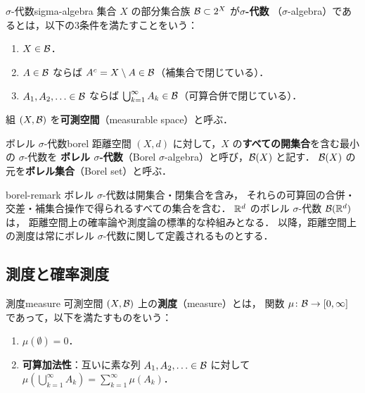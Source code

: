 \begin{definition}{$\sigma$-代数}{sigma-algebra}
  集合 $X$ の部分集合族 $\mathcal{B} \subset 2^X$ が\textbf{$\sigma$-代数}
  （$\sigma$-algebra）であるとは，以下の3条件を満たすことをいう：
  \begin{enumerate}
    \item $X \in \mathcal{B}$．
    \item $A \in \mathcal{B}$ ならば $A^c = X \setminus A \in \mathcal{B}$（補集合で閉じている）．
    \item $A_1, A_2, \ldots \in \mathcal{B}$ ならば
      $\bigcup_{k=1}^{\infty} A_k \in \mathcal{B}$（可算合併で閉じている）．
  \end{enumerate}
  組 $(X, \mathcal{B})$ を\textbf{可測空間}（measurable space）と呼ぶ．
\end{definition}

\begin{definition}{ボレル $\sigma$-代数}{borel}
  距離空間 $(X, d)$ に対して，$X$ の\textbf{すべての開集合}を含む最小の $\sigma$-代数を
  \textbf{ボレル $\sigma$-代数}（Borel $\sigma$-algebra）と呼び，$\mathcal{B}(X)$ と記す．
  $\mathcal{B}(X)$ の元を\textbf{ボレル集合}（Borel set）と呼ぶ．
\end{definition}

\begin{remark}{}{borel-remark}
  ボレル $\sigma$-代数は開集合・閉集合を含み，
  それらの可算回の合併・交差・補集合操作で得られるすべての集合を含む．
  $\mathbb{R}^d$ のボレル $\sigma$-代数 $\mathcal{B}(\mathbb{R}^d)$ は，
  距離空間上の確率論や測度論の標準的な枠組みとなる．
  以降，距離空間上の測度は常にボレル $\sigma$-代数に関して定義されるものとする．
\end{remark}

\subsection{測度と確率測度}
\label{subsec:measures}

\begin{definition}{測度}{measure}
  可測空間 $(X, \mathcal{B})$ 上の\textbf{測度}（measure）とは，
  関数 $\mu \colon \mathcal{B} \to [0, \infty]$ であって，以下を満たすものをいう：
  \begin{enumerate}
    \item $\mu(\emptyset) = 0$．
    \item \textbf{可算加法性}：互いに素な列 $A_1, A_2, \ldots \in \mathcal{B}$
      に対して $\mu\!\left(\bigcup_{k=1}^{\infty} A_k\right) = \sum_{k=1}^{\infty} \mu(A_k)$．
  \end{enumerate}
\end{definition}

